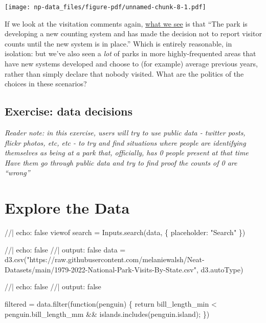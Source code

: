 \documentclass[
  letterpaper,
  DIV=11,
  numbers=noendperiod]{scrartcl}
\newenvironment{Shaded}{\begin{snugshade}}{\end{snugshade}}
\newcommand{\NormalTok}[1]{\textcolor[rgb]{0.00,0.23,0.31}{#1}}
\begin{document}
\texttt{[image: np-data\_files/figure-pdf/unnamed-chunk-8-1.pdf]}

If we look at the visitation comments again,
\href{https://irma.nps.gov/Stats/SSRSReports/Park\%20Specific\%20Reports/Monthly\%20Visitation\%20Comments\%20By\%20Park}{what
we see} is that ``The park is developing a new counting system and has
made the decision not to report visitor counts until the new system is
in place.'' Which is entirely reasonable, in isolation: but we've also
seen a \emph{lot} of parks in more highly-frequented areas that have new
systems developed and choose to (for example) average previous years,
rather than simply declare that nobody visited. What are the politics of
the choices in these scenarios?

\subsection{Exercise: data decisions}\label{exercise-data-decisions}

\emph{Reader note: in this exercise, users will try to use public data -
twitter posts, flickr photos, etc, etc - to try and find situations
where people are identifying themselves as being at a park that,
officially, has 0 people present at that time Have them go through
public data and try to find proof the counts of 0 are ``wrong''}

\section{Explore the Data}

\begin{Shaded}
\begin{Highlighting}[]
\NormalTok{//| echo: false}
\NormalTok{viewof search = Inputs.search(data, \{}
\NormalTok{  placeholder: "Search"}
\NormalTok{\})}
\end{Highlighting}
\end{Shaded}

\begin{Shaded}
\begin{Highlighting}[]
\NormalTok{//| echo: false}
\NormalTok{//| output: false}
\NormalTok{data = d3.csv("https://raw.githubusercontent.com/melaniewalsh/Neat{-}Datasets/main/1979{-}2022{-}National{-}Park{-}Visits{-}By{-}State.csv", d3.autoType)}
\end{Highlighting}
\end{Shaded}

\begin{Shaded}
\begin{Highlighting}[]
\NormalTok{//| echo: false}
\NormalTok{//| output: false}


\NormalTok{filtered = data.filter(function(penguin) \{}
\NormalTok{  return bill\_length\_min \textless{} penguin.bill\_length\_mm \&\&}
\NormalTok{         islands.includes(penguin.island);}
\NormalTok{\})}
\end{Highlighting}
\end{Shaded}
\end{document}

